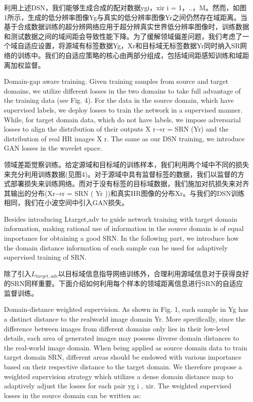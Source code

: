 利用上述DSN，我们能够生成合成的配对数据{ygi，xir} i = 1，..，M。然而，如图1所示，生成的低分辨率图像Yg与真实的低分辨率图像Yr之间仍然存在域距离。当基于合成数据训练的超分辨网络应用于超分辨真实世界低分辨率图像时，训练数据和测试数据之间的域间距会导致性能下降。为了缓解领域偏差问题，我们考虑了一个域自适应设置，将源域有标签数据{Yg，Xr}和目标域无标签数据Yr同时纳入SR网络的训练中。我们的自适应策略的核心由两部分组成，包括域间距感知训练和域距离加权监督。

Domain-gap aware training. Given training samples from source and target domains, we utilize different losses in the two domains to take full advantage of the training data (see Fig. 4). For the data in the source domain, which have supervised labels, we deploy losses to train the network in a supervised manner. While, for target domain data, which do not have labels, we impose adversarial losses to align the distribution of their outputs X r→r = SRN (Yr) and the distribution of real HR images X r. The same as our DSN training, we introduce GAN losses in the wavelet space.

领域差距觉察训练。给定源域和目标域的训练样本，我们利用两个域中不同的损失来充分利用训练数据(见图4)。对于源域中具有监督标签的数据，我们以监督的方式部署损失来训练网络。而对于没有标签的目标域数据，我们施加对抗损失来对齐其输出的分布(Xr→r = SRN ( Yr ))和真实HR图像的分布Xr。与我们的DSN训练相同，我们在小波空间中引入GAN损失。

Besides introducing Ltarget,adv to guide network training with target domain information, making rational use of information in the source domain is of equal importance for obtaining a good SRN. In the following part, we introduce how the domain distance information of each sample can be used for adaptively supervised training of SRN.

除了引入$L_{target,adv}$以目标域信息指导网络训练外，合理利用源域信息对于获得良好的SRN同样重要。下面介绍如何利用每个样本的领域距离信息进行SRN的自适应监督训练。

Domain-distance weighted supervision. As shown in Fig. 1, each sample in Yg has a distinct distance to the realworld image domain Yr. More specifically, since the difference between images from different domains only lies in their low-level details, each area of generated images may possess diverse domain distances to the real-world image domain. When being applied as source domain data to train target domain SRN, different areas should be endowed with various importance based on their respective distance to the target domain. We therefore propose a weighted supervision strategy which utilizes a dense domain distance map to adaptively adjust the losses for each pair {yg i , xir}. The weighted supervised losses in the source domain can be written as:

